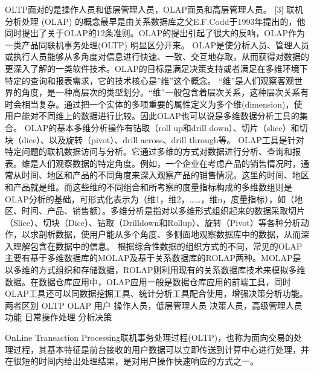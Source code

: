 \documentclass[letterpaper,12pt,english]{sphinxmanual}
\begin{document}


OLTP面对的是操作人员和低层管理人员，OLAP面员和高层管理人员。 {[}3{]}
联机分析处理 (OLAP) 的概念最早是由关系数据库之父E.F.Codd于1993年提出的，他同时提出了关于OLAP的12条准则。OLAP的提出引起了很大的反响，OLAP作为一类产品同联机事务处理(OLTP) 明显区分开来。
OLAP是使分析人员、管理人员或执行人员能够从多角度对信息进行快速、一致、交互地存取，从而获得对数据的更深入了解的一类软件技术。OLAP的目标是满足决策支持或者满足在多维环境下特定的查询和报表需求，它的技术核心是”维”这个概念。
“维”是人们观察客观世界的角度，是一种高层次的类型划分。“维”一般包含着层次关系，这种层次关系有时会相当复杂。通过把一个实体的多项重要的属性定义为多个维(dimension)，使用户能对不同维上的数据进行比较。因此OLAP也可以说是多维数据分析工具的集合。
OLAP的基本多维分析操作有钻取（roll up和drill down）、切片（slice）和切块（dice）、以及旋转（pivot）、drill across、drill through等。
OLAP工具是针对特定问题的联机数据访问与分析。它通过多维的方式对数据进行分析、查询和报表。维是人们观察数据的特定角度。例如，一个企业在考虑产品的销售情况时，通常从时间、地区和产品的不同角度来深入观察产品的销售情况。这里的时间、地区和产品就是维。而这些维的不同组合和所考察的度量指标构成的多维数组则是OLAP分析的基础，可形式化表示为（维1，维2，……，维n，度量指标），如（地区、时间、产品、销售额）。多维分析是指对以多维形式组织起来的数据采取切片（Slice）、切块（Dice）、钻取（Drill\sphinxhyphen{}down和Roll\sphinxhyphen{}up）、旋转（Pivot）等各种分析动作，以求剖析数据，使用户能从多个角度、多侧面地观察数据库中的数据，从而深入理解包含在数据中的信息。
根据综合性数据的组织方式的不同，常见的OLAP主要有基于多维数据库的MOLAP及基于关系数据库的ROLAP两种。MOLAP是以多维的方式组织和存储数据，ROLAP则利用现有的关系数据库技术来模拟多维数据。在数据仓库应用中，OLAP应用一般是数据仓库应用的前端工具，同时OLAP工具还可以同数据挖掘工具、统计分析工具配合使用，增强决策分析功能。
两者区别
OLTP
OLAP
用户
操作人员，低层管理人员
决策人员，高级管理人员
功能
日常操作处理
分析决策

On\sphinxhyphen{}Line Transaction Processing联机事务处理过程(OLTP)，也称为面向交易的处理过程，其基本特征是前台接收的用户数据可以立即传送到计算中心进行处理，并在很短的时间内给出处理结果，是对用户操作快速响应的方式之一。


\end{document}

